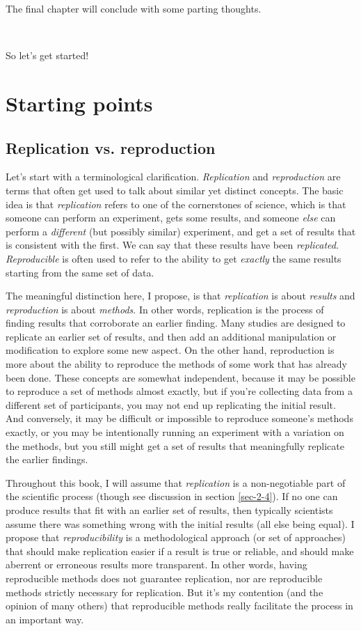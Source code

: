 \documentclass{book}
\begin{document}
The final chapter will conclude with some parting thoughts.

~

So let's get started!
\chapter{Starting points}
\label{sec-2}
\label{starting}
\section{Replication vs. reproduction}
\label{sec-2-1}
\label{replication-v-reproduction}

Let's start with a terminological clarification.  \emph{Replication} and \emph{reproduction} are terms that often get used to talk about similar yet distinct concepts.  The basic idea is that \emph{replication} refers to one of the cornerstones of science, which is that someone can perform an experiment, gets some results, and someone \emph{else} can perform a \emph{different} (but possibly similar) experiment, and get a set of results that is consistent with the first. We can say that these results have been \emph{replicated}.  \emph{Reproducible} is often used to refer to the ability to get \emph{exactly} the same results starting from the same set of data.

The meaningful distinction here, I propose, is that \emph{replication} is about \emph{results} and \emph{reproduction} is about \emph{methods}.  In other words, replication is the process of finding results that corroborate an earlier finding.  Many studies are designed to replicate an earlier set of results, and then add an additional manipulation or modification to explore some new aspect. On the other hand, reproduction is more about the ability to reproduce the methods of some work that has already been done. These concepts are somewhat independent, because it may be possible to reproduce a set of methods almost exactly, but if you're collecting data from a different set of participants, you may not end up replicating the initial result.  And conversely, it may be difficult or impossible to reproduce someone's methods exactly, or you may be intentionally running an experiment with a variation on the methods, but you still might get a set of results that meaningfully replicate the earlier findings.

Throughout this book, I will assume that \emph{replication} is a non-negotiable part of the scientific process (though see discussion in section \ref{sec-2-4}).  If no one can produce results that fit with an earlier set of results, then typically scientists assume there was something wrong with the initial results (all else being equal).  I propose that \emph{reproducibility} is a methodological approach (or set of approaches) that should make replication easier if a result is true or reliable, and should make aberrent or erroneous results more transparent.  In other words, having reproducible methods does not guarantee replication, nor are reproducible methods strictly necessary for replication. But it's my contention (and the opinion of many others) that reproducible methods really facilitate the process in an important way.
\end{document}
